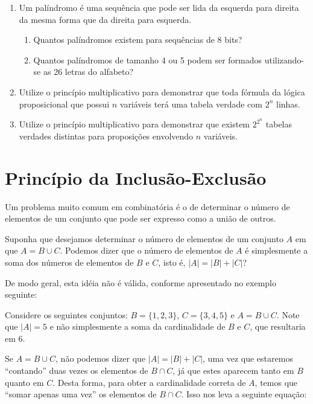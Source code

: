 \begin{enumerate}
\begin{enumerate}
     \end{enumerate}
     \item Um palíndromo é uma sequência que pode ser lida da esquerda
       para direita da mesma forma que da direita para esquerda.
     \begin{enumerate}
       \item Quantos palíndromos existem para sequências de 8 bits?
       \item Quantos palíndromos de tamanho 4 ou 5 podem ser formados
         utilizando-se as 26 letras do alfabeto?
     \end{enumerate}
     \item Utilize o princípio multiplicativo para demonstrar que toda
       fórmula da lógica proposicional que possui $n$ variáveis terá
       uma tabela verdade com $2^n$ linhas.
     \item Utilize o princípio multiplicativo para demonstrar que
       existem $2^{2^n}$ tabelas verdades distintas para proposições
       envolvendo $n$ variáveis.
\end{enumerate}

\section{Princípio da Inclusão-Exclusão}

Um problema muito comum em combinatória é o de determinar o número de
elementos de um conjunto que pode ser expresso como a união de outros.

Suponha que desejamos determinar o número de elementos de um conjunto
$A$ em que $A = B \cup C$. Podemos dizer que o número de elementos de
$A$ é simplesmente a soma dos números de elementos de  $B$
 e $C$, isto é, $|A| = |B| + |C|$?

De modo geral, esta idéia não é válida, conforme apresentado no
exemplo seguinte:

\begin{Example}
Considere os seguintes conjuntos: $B = \{1,2,3\}$, $C=\{3,4,5\}$ e $A
= B\cup C$. Note que $|A| = 5$ e não simplesmente a soma da
cardinalidade de $B$ e $C$, que resultaria em $6$.
\end{Example}

Se $A = B \cup C$, não podemos dizer que $|A| = |B| + |C|$, uma vez
que estaremos ``contando'' duas vezes os elementos de $B\cap C$, já
que estes aparecem tanto em $B$ quanto em $C$. Desta forma, para obter
a cardinalidade correta de $A$, temos que ``somar apenas uma vez'' os
elementos de $B\cap C$. Isso nos leva a seguinte equação:

